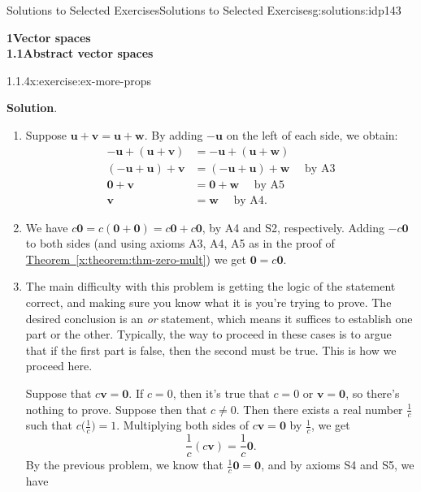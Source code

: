 \documentclass[oneside,10pt,]{book}
\newcommand{\blocktitlefont}{\relax}
\newcommand{\xreffont}{\relax}
\numberwithin{equation}{section}
\newcommand{\uu}{\mathbf{u}}
\newcommand{\vv}{\mathbf{v}}
\newcommand{\ww}{\mathbf{w}}
\newcommand{\zer}{\mathbf{0}}
\newcommand{\amp}{&}
\begin{document}
\begin{solutions-chapter}{Solutions to Selected Exercises}{}{Solutions to Selected Exercises}{}{}{g:solutions:idp143}
\par\medskip
\noindent\textbf{\Large{}1\space\textperiodcentered\space{}Vector spaces\\
1.1\space\textperiodcentered\space{}Abstract vector spaces}
\begin{inlinesolution}{1.1.4}{}{x:exercise:ex-more-props}%
\par\smallskip%
\noindent\textbf{\blocktitlefont Solution}.\hypertarget{g:solution:idp144-back}{}\quad{}%
\begin{enumerate}
\item{}Suppose \(\uu+\vv=\uu+\ww\). By adding \(-\uu\) on the left of each side, we obtain:%
\begin{align*}
-\uu+(\uu+\vv) \amp =-\uu+(\uu+\ww)\\
(-\uu+\uu)+\vv \amp =(-\uu+\uu)+\ww \quad \text{ by A3}\\
\zer+\vv \amp =\zer+\ww \quad \text{ by A5}\\
\vv \amp =\ww \quad \text{ by A4}\text{.}
\end{align*}
%
\item{}We have \(c\zer = c(\zer+\zer) = c\zer +c\zer\), by A4 and S2, respectively. Adding \(-c\zer\) to both sides (and using axioms A3, A4, A5 as in the proof of \hyperref[x:theorem:thm-zero-mult]{Theorem~{\xreffont\ref{x:theorem:thm-zero-mult}}}) we get \(\zer = c\zer\).%
\item{}The main difficulty with this problem is getting the logic of the statement correct, and making sure you know what it is you're trying to prove. The desired conclusion is an \emph{or} statement, which means it suffices to establish one part or the other. Typically, the way to proceed in these cases is to argue that if the first part is false, then the second must be true. This is how we proceed here.%
\par
Suppose that \(c\vv=\zer\). If \(c=0\), then it's true that \(c=0\) or \(\vv=\zer\), so there's nothing to prove. Suppose then that \(c\neq 0\). Then there exists a real number \(\frac1c\) such that \(c\bigl(\frac1c\bigr)=1\). Multiplying both sides of \(c\vv=\zer\) by \(\frac1c\), we get%
\begin{equation*}
\frac1c(c\vv)=\frac1c\zer\text{.}
\end{equation*}
By the previous problem, we know that \(\frac1c\zer = \zer\), and by axioms S4 and S5, we have%
\begin{equation*}

\end{equation*}
\end{enumerate}
\end{inlinesolution}
\end{solutions-chapter}
\end{document}

